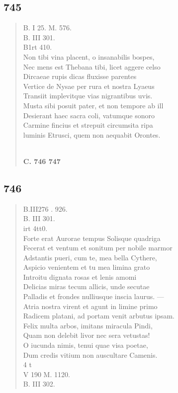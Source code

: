 \documentclass[11pt, a4paper]{report}
\begin{document}
            \subsection*{745}
      \begin{verse}
      B. I 25. M. 576. \\ B. III 301. \\ B1rt 410. \\ Non tibi vina placent, o insanabilis bospes, \\ Nec mens est Thebana tibi, licet aggere celso \\ Dircaeae rupis dicas fluxisse parentes \\ Vertice de Nysae per rura et nostra Lyaeus \\ Transiit implevitque vias nigrantibus uvis. \\ Musta sibi posuit pater, et non tempore ab ill \\ Desierant haec sacra coli, vatumque sonoro \\ Carmine fincius et strepuit circumsita ripa \\ luminis Etrusci, quem non aequabit Orontes. \\ 
        ﻿\pagebreak 
    \begin{center} \textbf{C. 746 747} \end{center} \marginpar{[01]} 
      \end{verse}
  
            \subsection*{746}
      \begin{verse}
      B.III276 . 926. \\ B. III 301. \\ irt 4tt0. \\ Forte erat Aurorae tempus Solisque quadriga \\ Fecerat et ventum et sonitum per nobile marmor \\ Adstantis pueri, cum te, mea bella Cythere, \\ Aspicio venientem et tu mea limina grato \\ Introitu dignata rosas et lenis amomi \\ Delicias miras tecum allicis, unde secutae \\ Palladis et frondes nulliusque inscia laurus. — \\ Atria nostra virent et agunt in limine primo \\ Radicem platani, ad portam venit arbutus ipsam. \\ Felix multa arbos, imitans miracula Pindi, \\ Quam non delebit livor nec sera vetustas! \\ O iucunda nimis, tenui quae visa poetae, \\ Dum credis vitium non auscultare Camenis. \\ 4 t \\ V 190 M. 1120. \\ B. III 302. \\ 
      \end{verse}
  
\end{document}
